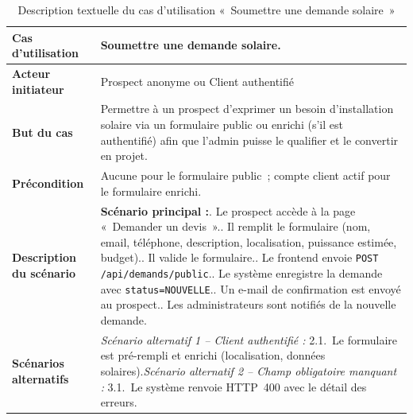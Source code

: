 \begin{table}[H]
  \caption{Description textuelle du cas d'utilisation «~Soumettre une demande solaire~»}
  \label{tab:cu-soumettre-demande}
  \centering
  \begin{tabularx}{\textwidth}{|L{3.8cm}|X|}
    \hline
    \textbf{Cas d'utilisation} & Soumettre une demande solaire. \\
    \hline
    \textbf{Acteur initiateur} & Prospect anonyme ou Client authentifié \\
    \hline
    \textbf{But du cas} & Permettre à un prospect d'exprimer un besoin d'installation solaire via un formulaire public ou enrichi (s'il est authentifié) afin que l'admin puisse le qualifier et le convertir en projet. \\
    \hline
    \textbf{Précondition} & Aucune pour le formulaire public~; compte client actif pour le formulaire enrichi. \\
    \hline
    \textbf{Description du scénario} &
    \textbf{Scénario principal :}. Le prospect accède à la page «~Demander un devis~».. Il remplit le formulaire (nom, email, téléphone, description, localisation, puissance estimée, budget).. Il valide le formulaire.. Le frontend envoie \texttt{POST /api/demands/public}.. Le système enregistre la demande avec \texttt{status=NOUVELLE}.. Un e-mail de confirmation est envoyé au prospect.. Les administrateurs sont notifiés de la nouvelle demande.\\
    \hline
    \textbf{Scénarios alternatifs} &
    \textit{Scénario alternatif 1 -- Client authentifié :}\newline
    \hspace*{6pt}2.1.~Le formulaire est pré-rempli et enrichi (localisation, données solaires).\newline[2pt]
    \textit{Scénario alternatif 2 -- Champ obligatoire manquant :}\newline
    \hspace*{6pt}3.1.~Le système renvoie HTTP~400 avec le détail des erreurs.\\
    \hline
  \end{tabularx}
\end{table}

